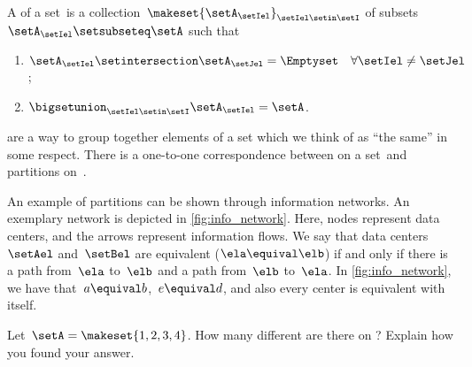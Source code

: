 \begin{ctdefinition}[Partition]
    \label{def:partition}
    A  of a set~\setA is a collection~$\makeset{\setA_\setIel}_{\setIel\setin \setI}$ of subsets~$\setA_\setIel\setsubseteq \setA$ such that
    \begin{enumerate}
        \item $\setA_\setIel\setintersection \setA_\setJel=\Emptyset \quad \forall \setIel\neq \setJel$;
        \item $\bigsetunion_{\setIel\setin \setI}\setA_\setIel=\setA$.
    \end{enumerate}
\end{ctdefinition}

\begin{remark}
     are a way to group together elements of a set which we think of as ``the same'' in some respect.
    There is a one-to-one correspondence between  on a set~\setA and partitions on~\setA.
\end{remark}

\begin{marginfigure}
    \centering
    \caption{
        \label{fig:info_network}
    }
\end{marginfigure}

\begin{example}
    An example of partitions can be shown through information networks.
    An exemplary network is depicted in \cref{fig:info_network}.
    Here, nodes represent data centers, and the arrows represent information flows.
    We say that data centers~$\setAel$ and~$\setBel$ are equivalent ($\ela\equival \elb$) if and only if there is a path from~$\ela$ to~$\elb$ and a path from~$\elb$ to~$\ela$.
    In \cref{fig:info_network}, we have that~$a\equival b$,~$e\equival d$, and also every center is equivalent with itself.
\end{example}

\vfill
\begin{gradedexercise}
    \label{ex:CountingEquivalenceRelations}
    Let~$\setA = \makeset{ 1, 2, 3, 4 }$.
    How many different  are there on \setA?
    Explain how you found your answer.
\end{gradedexercise}

